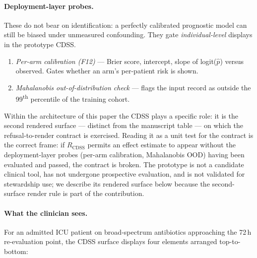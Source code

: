 \documentclass[11pt,a4paper]{article}
\begin{document}
\paragraph{Deployment-layer probes.} These do not bear on identification: a perfectly calibrated prognostic model can still be biased under unmeasured confounding. They gate \emph{individual-level} displays in the prototype CDSS.
\begin{enumerate}[leftmargin=*,itemsep=2pt]
\item \emph{Per-arm calibration (F12)} --- Brier score, intercept, slope of logit($\hat p$) versus observed. Gates whether an arm's per-patient risk is shown.
\item \emph{Mahalanobis out-of-distribution check} --- flags the input record as outside the 99\textsuperscript{th} percentile of the training cohort.
\end{enumerate}
Within the architecture of this paper the CDSS plays a specific role: it is the second rendered surface --- distinct from the manuscript table --- on which the refusal-to-render contract is exercised. Reading it as a unit test for the contract is the correct frame: if $R_{\text{CDSS}}$ permits an effect estimate to appear without the deployment-layer probes (per-arm calibration, Mahalanobis OOD) having been evaluated and passed, the contract is broken. The prototype is not a candidate clinical tool, has not undergone prospective evaluation, and is not validated for stewardship use; we describe its rendered surface below because the second-surface render rule is part of the contribution.

\paragraph{What the clinician sees.} For an admitted ICU patient on broad-spectrum antibiotics approaching the 72\,h re-evaluation point, the CDSS surface displays four elements arranged top-to-bottom:
\end{document}

